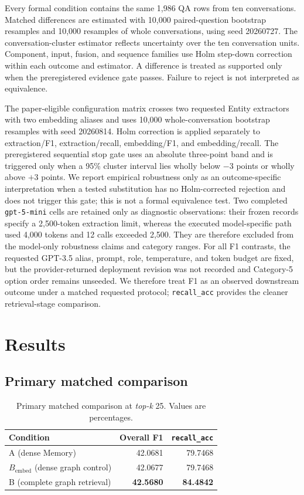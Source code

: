 \documentclass[10pt,twocolumn]{article}
\newcommand{\recallacc}{\texttt{recall\_acc}}
\newcommand{\bembed}{B_{\mathrm{embed}}}
\newcommand{\topk}{\textit{top-k}}
\begin{document}
Every formal condition contains the same 1,986 QA rows from ten conversations.
Matched differences are estimated with 10,000 paired-question bootstrap
resamples and 10,000 resamples of whole conversations, using seed 20260727.
The conversation-cluster estimator reflects uncertainty over the ten
conversation units. Component, input, fusion, and sequence families use Holm
step-down correction within each outcome and estimator. A difference is
treated as supported only when the preregistered evidence gate passes. Failure
to reject is not interpreted as equivalence.

The paper-eligible configuration matrix crosses two requested Entity
extractors with two embedding aliases and uses 10,000 whole-conversation
bootstrap resamples with seed 20260814. Holm correction is applied separately
to extraction/F1, extraction/recall, embedding/F1, and embedding/recall. The
preregistered sequential stop gate uses an absolute three-point band and is
triggered only when a 95\% cluster interval lies wholly below $-3$ points or
wholly above $+3$ points. We report empirical robustness only as an
outcome-specific interpretation when a tested substitution has no
Holm-corrected rejection and does not trigger this gate; this is not a formal
equivalence test. Two completed
\texttt{gpt-5-mini} cells are retained only as diagnostic observations: their
frozen records specify a 2,500-token extraction limit, whereas the executed
model-specific path used 4,000 tokens and 12 calls exceeded 2,500. They are
therefore excluded from the model-only robustness claims and category ranges.
For all F1 contrasts, the requested GPT-3.5 alias, prompt, role, temperature,
and token budget are fixed, but the provider-returned deployment revision was
not recorded and Category-5 option order remains unseeded. We therefore treat
F1 as an observed downstream outcome under a matched requested protocol;
\recallacc{} provides the cleaner retrieval-stage comparison.

\section{Results}

\subsection{Primary matched comparison}

\begin{table}[t]
\centering
\caption{Primary matched comparison at \topk{} 25. Values are percentages.}
\label{tab:primary}
\begin{tabular}{@{}lrr@{}}
\toprule
Condition & Overall F1 & \recallacc{} \\
\midrule
A (dense Memory) & 42.0681 & 79.7468 \\
\(\bembed\) (dense graph control) & 42.0677 & 79.7468 \\
B (complete graph retrieval) & \textbf{42.5680} & \textbf{84.4842} \\
\bottomrule
\end{tabular}
\end{table}
\end{document}

